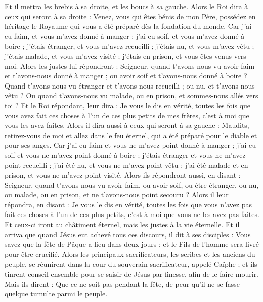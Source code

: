 \begin{multicols}{2}
Et il mettra les brebis à sa droite, et les boucs à sa gauche.
Alors le Roi dira à ceux qui seront à sa droite : Venez, vous qui êtes bénis de mon Père, possédez en héritage le Royaume qui vous a été préparé dès la fondation du monde.
Car j'ai eu faim, et vous m'avez donné à manger ; j'ai eu soif, et vous m'avez donné à boire ; j'étais étranger, et vous m'avez recueilli ;
j'étais nu, et vous m'avez vêtu ; j'étais malade, et vous m'avez visité ; j'étais en prison, et vous êtes venus vers moi.
Alors les justes lui répondront : Seigneur, quand t'avons-nous vu avoir faim et t'avons-nous donné à manger ; ou avoir soif et t'avons-nous donné à boire ?
Quand t'avons-nous vu étranger et t'avons-nous recueilli ; ou nu, et t'avons-nous vêtu ?
Ou quand t'avons-nous vu malade, ou en prison, et sommes-nous allés vers toi ?
Et le Roi répondant, leur dira : Je vous le dis en vérité, toutes les fois que vous avez fait ces choses à l'un de ces plus petits de mes frères, c'est à moi que vous les avez faites.
Alors il dira aussi à ceux qui seront à sa gauche : Maudits, retirez-vous de moi et allez dans le feu éternel, qui a été préparé pour le diable et pour ses anges.
Car j'ai eu faim et vous ne m'avez point donné à manger ; j'ai eu soif et vous ne m'avez point donné à boire ;
j'étais étranger et vous ne m'avez point recueilli ; j'ai été nu, et vous ne m'avez point vêtu ; j'ai été malade et en prison, et vous ne m'avez point visité.
Alors ils répondront aussi, en disant : Seigneur, quand t'avons-nous vu avoir faim, ou avoir soif, ou être étranger, ou nu, ou malade, ou en prison, et ne t'avons-nous point secouru ?
Alors il leur répondra, en disant : Je vous le dis en vérité, toutes les fois que vous n'avez pas fait ces choses à l'un de ces plus petits, c'est à moi que vous ne les avez pas faites.
Et ceux-ci iront au châtiment éternel, mais les justes à la vie éternelle.
\VerseOne{}Et il arriva que quand Jésus eut achevé tous ces discours, il dit à ses disciples :
Vous savez que la fête de Pâque a lieu dans deux jours ; et le Fils de l'homme sera livré pour être crucifié.
Alors les principaux sacrificateurs, les scribes et les anciens du peuple, se réunirent dans la cour du souverain sacrificateur, appelé Caïphe ;
et ils tinrent conseil ensemble pour se saisir de Jésus par finesse, afin de le faire mourir.
Mais ils dirent : Que ce ne soit pas pendant la fête, de peur qu'il ne se fasse quelque tumulte parmi le peuple.

\end{multicols}
